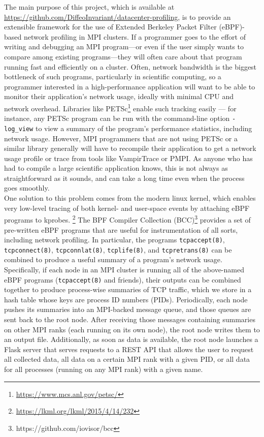 The main purpose of this project, which is available at \url{https://github.com/DiffeoInvariant/datacenter-profiling}, is to provide an extensible framework for the use of Extended Berkeley Packet Filter (eBPF)-based network profiling in MPI clusters. If a programmer goes to the effort of writing and debugging an MPI program---or even if the user simply wants to compare among existing programs---they will often care about that program running fast and efficiently on a cluster. Often, network bandwidth is the biggest bottleneck of such programs, particularly in scientific computing, so a programmer interested in a high-performance application will want to be able to monitor their application's network usage, ideally with minimal CPU and network overhead. Libraries like PETSc\footnote{\url{https://www.mcs.anl.gov/petsc/}} enable such tracking easily --- for instance, any PETSc program can be run with the command-line option \lstinline{-log_view} to view a summary of the program's performance statistics, including network usage. However, MPI programmers that are not using PETSc or a similar library generally will have to recompile their application to get a network usage profile or trace from tools like VampirTrace or PMPI. As anyone who has had to compile a large scientific application knows, this is not always as straightforward as it sounds, and can take a long time even when the process goes smoothly. \\
One solution to this problem comes from the modern linux kernel, which enables very low-level tracing of both kernel- and user-space events by attaching eBPF programs to kprobes. \footnote{\url{https://lkml.org/lkml/2015/4/14/232}} The BPF Compiler Collection (BCC)\footnote{https://github.com/iovisor/bcc} provides a set of pre-written eBPF programs that are useful for instrumentation of all sorts, including network profiling. In particular, the programs \lstinline{tcpaccept(8)}, \lstinline{tcpconnect(8)}, \lstinline{tcpconnlat(8)}, \lstinline{tcplife(8)}, and \lstinline{tcpretrans(8)} can be combined to produce a useful summary of a program's network usage. \\
Specifically, if each node in an MPI cluster is running all of the above-named eBPF programs (\lstinline{tcpaccept(8)} and friends), their outputs can be combined together to produce process-wise summaries of TCP traffic, which we store in a hash table whose keys are process ID numbers (PIDs). Periodically, each node pushes its summaries into an MPI-backed message queue, and those queues are sent back to the root node. After receiving those messages containing summaries on other MPI ranks (each running on its own node), the root node writes them to an output file. Additionally, as soon as data is available, the root node launches a Flask server that serves requests to a REST API that allows the user to request all collected data, all data on a certain MPI rank with a given PID, or all data for all processes (running on any MPI rank) with a given name.
